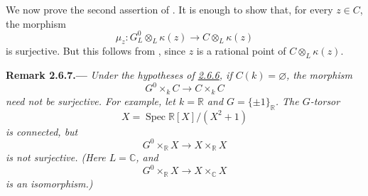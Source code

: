 We now prove the second assertion of . It is enough to show that,
for every \(z\in C\), the morphism
\[
  \mu_z:
  G^0_L\otimes_L\kappa(z)
  \longrightarrow
  C\otimes_L\kappa(z)
\]
is surjective. But this follows from , since \(z\) is a rational
point of \(C\otimes_L\kappa(z)\).

\medskip
{}\label{rem:sga3-VIA-2.6.7}%
\noindent\textbf{Remark 2.6.7.---}
\textit{Under the hypotheses of \hyperref[prop:sga3-VIA-2.6.6]{2.6.6}, if \(C(k)=\varnothing\), the
morphism
\[
  G^0\times_kC\longrightarrow C\times_kC
\]
need not be surjective. For example, let \(k=\mathbb R\) and
\(G=\{\pm1\}_{\mathbb R}\). The \(G\)-torsor
\[
  X=\operatorname{Spec}\mathbb R[X]/(X^2+1)
\]
is connected, but
\[
  G^0\times_{\mathbb R}X\longrightarrow X\times_{\mathbb R}X
\]
is not surjective. (Here \(L=\mathbb C\), and
\[
  G^0\times_{\mathbb R}X\longrightarrow X\times_{\mathbb C}X
\]
is an isomorphism.)}
